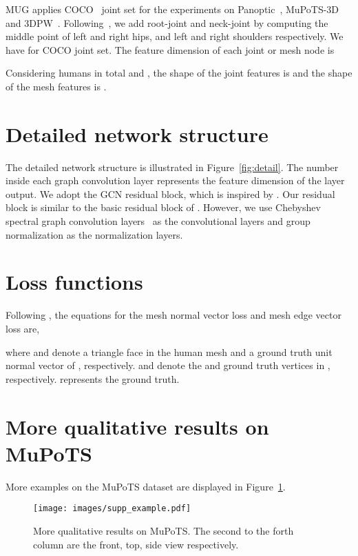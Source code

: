 \documentclass[runningheads]{llncs}
\begin{document}
MUG applies COCO~\cite{lin2014microsoft} joint set for the experiments on Panoptic~\cite{joo2015panoptic}, MuPoTS-3D~\cite{mehta2017monocular} and 3DPW~\cite{von2018recovering}. Following~\cite{choi2020pose2mesh}, we add root-joint and neck-joint by computing the middle point of left and right hips, and left and right shoulders respectively. We have  for COCO joint set. The feature dimension of each joint or mesh node is 

Considering  humans in total and , the shape of the joint features is  and the shape of the mesh features is .

\section{Detailed network structure}
The detailed network structure is illustrated in Figure~\ref{fig:detail}. The number inside each graph convolution layer represents the feature dimension of the layer output. We adopt the GCN residual block, which is inspired by \cite{he2016deep}. Our residual block is similar to the basic residual block of \cite{he2016deep}. However, we use Chebyshev spectral graph convolution layers~\cite{defferrard2016convolutional} as the convolutional layers and group normalization as the normalization layers.

\section{Loss functions}
Following \cite{wang2018pixel2mesh}, the equations for the mesh normal vector loss  and mesh edge  vector loss  are,


where  and  denote a triangle face in the human mesh and a ground truth unit normal vector of , respectively.  and  denote the  and  ground truth vertices in , respectively.  represents the ground truth.

\section{More qualitative results on MuPoTS}

More examples on the MuPoTS dataset are displayed in Figure~\ref{fig:mupo}.

\begin{figure}[t!]
  \centering
  {\texttt{[image: images/supp\_example.pdf]}}
 \vspace{9pt}
\caption{More qualitative results on MuPoTS. The second to the forth column are the front, top, side view respectively.} 
\label{fig:mupo}
\end{figure}
\end{document}
